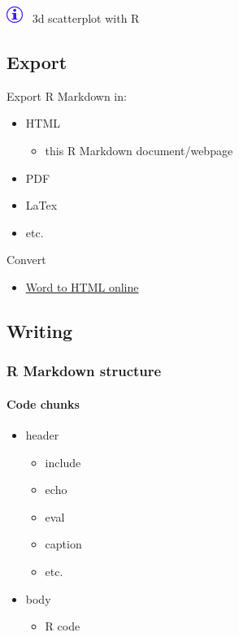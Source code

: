 \documentclass[
]{article}
\providecommand{\tightlist}{%
  \setlength{\itemsep}{0pt}\setlength{\parskip}{0pt}}
\begin{document}
\href{https://www.r-graph-gallery.com/3d_scatter_plot.html}{\includegraphics[width=0.20833in,height=\textheight]{www/info_darkblue.png}} 
3d scatterplot with R

\hypertarget{export}{%
\subsection{Export}\label{export}}

Export R Markdown in:

\begin{itemize}
\tightlist
\item
  HTML

  \begin{itemize}
  \tightlist
  \item
    this R Markdown document/webpage
  \end{itemize}
\item
  PDF
\item
  LaTex
\item
  etc.
\end{itemize}

Convert

\begin{itemize}
\tightlist
\item
  \href{https://wordtohtml.net/}{Word to HTML online}
\end{itemize}

\hypertarget{writing}{%
\subsection{Writing}\label{writing}}

\hypertarget{r-markdown-structure}{%
\subsubsection{R Markdown structure}\label{r-markdown-structure}}

\hypertarget{code-chunks}{%
\paragraph{Code chunks}\label{code-chunks}}

\begin{itemize}
\tightlist
\item
  header

  \begin{itemize}
  \tightlist
  \item
    include
  \item
    echo
  \item
    eval
  \item
    caption
  \item
    etc.
  \end{itemize}
\item
  body

  \begin{itemize}
  \tightlist
  \item
    R code
  \end{itemize}
\end{itemize}
\end{document}

